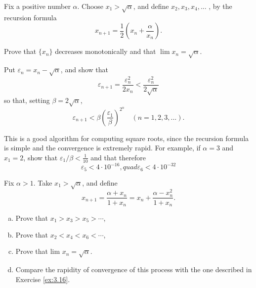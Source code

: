 \begin{myExercise}
    \label{ex:3.16}
    Fix a positive number $\alpha$. 
    Choose $x_1 > \sqrt{\alpha}$, 
    and define $x_2, x_3, x_4, ...$ , 
    by the recursion formula
    \begin{equation*}
        x_{n+1} = \frac{1}{2}\left( x_n + \frac{\alpha}{x_n} \right).
    \end{equation*}
    \begin{asparaenum}[(a)]
        \item Prove that $\{x_n\}$ decreases monotonically and that $\lim x_n = \sqrt{\alpha}$.
        \item  Put $\varepsilon_n = x_n - \sqrt{\alpha}$, and show that
        \begin{equation*}
            \varepsilon_{n+1} 
            = \frac{\varepsilon_n^2}{2 x_n} 
            < \frac{\varepsilon_n^2}{2 \sqrt{\alpha}} 
        \end{equation*}
        so that, setting $\beta = 2 \sqrt{\alpha}$,
        \begin{equation*}
            \varepsilon_{n+1} 
            < \beta \left( \frac{\varepsilon_1}{\beta} \right)^{2^n}
            \quad 
            ( n = 1, 2, 3, ... ) .
        \end{equation*}
        \item  This is a good algorithm for computing square roots, 
        since the recursion formula is simple and the convergence is extremely rapid. 
        For example, if $\alpha = 3$ and $x_1 = 2$, 
        show that $\varepsilon_1/\beta < \frac{1}{10}$ and that therefore
        \begin{equation*}
            \varepsilon_5 < 4 \cdot 10^{-16}, 
            quad 
            \varepsilon_6 < 4 \cdot 10^{-32}
        \end{equation*}
    \end{asparaenum}
\end{myExercise}


\begin{myExercise}
    \label{ex:3.17}
    Fix $\alpha > 1$. Take $x_1 > \sqrt{\alpha}$, and define
    \begin{equation*}
        x_{n+1} = \frac{\alpha + x_n}{1 + x_n} = x_n + \frac{\alpha - x_n^2}{1 + x_n}.
    \end{equation*}
    \begin{enumerate}[(a)]
        \item Prove that $x_1 > x_3 > x_5 >  \cdots$,
        \item Prove that $x_2 < x_4 < x_6 <  \cdots$,
        \item Prove that lim  $x_n = \sqrt{\alpha}$.
        \item Compare the rapidity of convergence of this process with the one described in Exercise \ref{ex:3.16}.
    \end{enumerate}
\end{myExercise}


